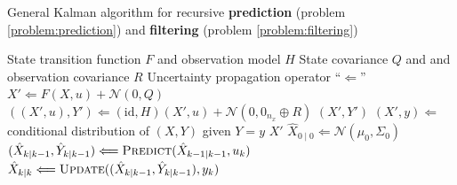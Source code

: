 \documentclass[oneside, article]{memoir}
\begin{document}
\begin{algorithm}
  \caption{
    \label{alg:kalman-filter}
    General Kalman algorithm for recursive \textbf{prediction} (problem
    \ref{problem:prediction}) and \textbf{filtering} (problem
  \ref{problem:filtering})}
  \begin{algorithmic}[1]
    \Require State transition function \(F\) and observation model \(H\)
    \Require State covariance \(Q\) and and observation covariance \(R\)
    \Require Uncertainty propagation operator ``\(\Longleftarrow\)''
    \State
    \(X' \Longleftarrow F(X, u) + \mathcal{N}(0, Q)\)
    \State
    \(((X', u), Y') \Longleftarrow (\text{id}, H)(X', u) +
    \mathcal{N}(0, 0_{n_x} \oplus R)\)
    \State\Return \((X', Y')\)
    \EndFunction
    \State
    \((X', y) \Longleftarrow\) conditional distribution of \((X,Y)\)
    given \(Y=y\)
    \State\Return \(X'\)
    \EndFunction
    \State \(\hat X_{0 \mid 0} \Longleftarrow \mathcal{N}(\mu_0, \Sigma_0)\)
    \State \( (\hat X_{k \mid k-1}, \hat Y_{k \mid k-1})
    \Longleftarrow \textsc{Predict}(\hat X_{k-1 \mid k-1}, u_k) \)
    \State \( \hat X_{k \mid k}  \Longleftarrow \textsc{Update}((\hat
    X_{k \mid k-1}, \hat Y_{k \mid k-1}), y_k) \)
    \EndFor
    \EndProcedure
  \end{algorithmic}
\end{algorithm}
\end{document}
